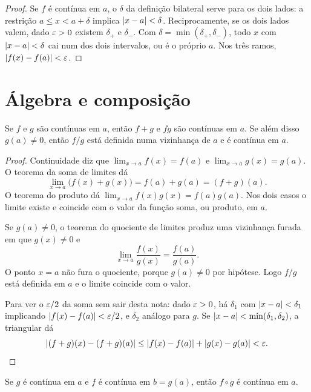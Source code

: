 \documentclass[11pt,a4paper]{article}
\begin{document}
\begin{proof}
Se $f$ \'e cont\'inua em $a$, o $\delta$ da defini\c{c}\~ao bilateral serve para os dois lados: a restri\c{c}\~ao $a\le x<a+\delta$ implica $\left\lvert x-a \right\rvert<\delta$. Reciprocamente, se os dois lados valem, dado $\varepsilon>0$ existem $\delta_+$ e $\delta_-$. Com $\delta=\min(\delta_+,\delta_-)$, todo $x$ com $\left\lvert x-a \right\rvert<\delta$ cai num dos dois intervalos, ou \'e o pr\'oprio $a$. Nos tr\^es ramos, $\left\lvert f(x)-f(a) \right\rvert<\varepsilon$.
\end{proof}

\section{\'Algebra e composi\c{c}\~ao}
\label{sec:alg-cont}

\begin{teorema}
\label{teo:alg-cont}
Se $f$ e $g$ s\~ao cont\'inuas em $a$, ent\~ao $f+g$ e $fg$ s\~ao cont\'inuas em $a$. Se al\'em disso $g(a)\neq 0$, ent\~ao $f/g$ est\'a definida numa vizinhan\c{c}a de $a$ e \'e cont\'inua em $a$.
\end{teorema}

\begin{proof}
Continuidade diz que $\lim_{x\to a}f(x)=f(a)$ e $\lim_{x\to a}g(x)=g(a)$. O teorema da soma de limites d\'a
\[
\lim_{x\to a}\bigl(f(x)+g(x)\bigr)=f(a)+g(a)=(f+g)(a).
\]
O teorema do produto d\'a $\lim_{x\to a}f(x)g(x)=f(a)g(a)$. Nos dois casos o limite existe e coincide com o valor da fun\c{c}\~ao soma, ou produto, em $a$.

Se $g(a)\neq 0$, o teorema do quociente de limites produz uma vizinhan\c{c}a furada em que $g(x)\neq 0$ e
\[
\lim_{x\to a}\frac{f(x)}{g(x)}=\frac{f(a)}{g(a)}.
\]
O ponto $x=a$ n\~ao fura o quociente, porque $g(a)\neq 0$ por hip\'otese. Logo $f/g$ est\'a definida em $a$ e o limite coincide com o valor.

Para ver o $\varepsilon/2$ da soma sem sair desta nota: dado $\varepsilon>0$, h\'a $\delta_1$ com $\left\lvert x-a \right\rvert<\delta_1$ implicando $\left\lvert f(x)-f(a) \right\rvert<\varepsilon/2$, e $\delta_2$ an\'alogo para $g$. Se $\left\lvert x-a \right\rvert<\min(\delta_1,\delta_2)$, a triangular d\'a
\[
\left\lvert (f+g)(x)-(f+g)(a) \right\rvert\le \left\lvert f(x)-f(a) \right\rvert+\left\lvert g(x)-g(a) \right\rvert<\varepsilon.
\]
\end{proof}

\begin{teorema}
\label{teo:composicao}
Se $g$ \'e cont\'inua em $a$ e $f$ \'e cont\'inua em $b=g(a)$, ent\~ao $f\circ g$ \'e cont\'inua em $a$.
\end{teorema}
\end{document}
